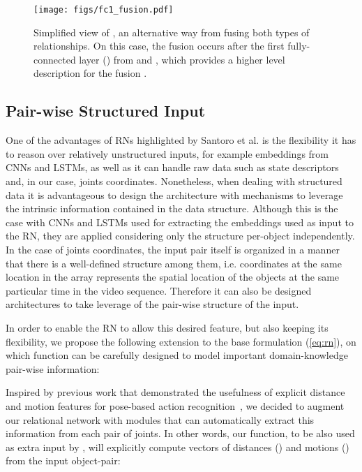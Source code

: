 \documentclass[journal,twoside]{IEEEtran}
\begin{document}
\begin{figure}[t]
	\centering
	\texttt{[image: figs/fc1\_fusion.pdf]}
	\caption{
	Simplified view of , an alternative way from fusing both types of relationships. On this case, the fusion occurs after the first fully-connected layer () from  and , which provides a higher level description for the fusion .
	}
	\label{fig:fc1_fusion}
\end{figure}

\subsection{Pair-wise Structured Input}


One of the advantages of RNs highlighted by Santoro et al.\cite{Santoro2017} is the flexibility it has to reason over relatively unstructured inputs, for example embeddings from CNNs and LSTMs, as well as it can handle raw data such as state descriptors and, in our case, joints coordinates.
Nonetheless, when dealing with structured data it is advantageous to design the architecture with mechanisms to leverage the intrinsic information contained in the data structure.
Although this is the case with CNNs and LSTMs used for extracting the embeddings used as input to the RN, they are applied considering only the structure per-object independently.
In the case of joints coordinates, the input pair itself is organized in a manner that there is a well-defined structure among them, i.e. coordinates at the same location in the array represents the spatial location of the objects at the same particular time in the video sequence.
Therefore it can also be designed architectures to take leverage of the pair-wise structure of the input.

In order to enable the RN to allow this desired feature, but also keeping its flexibility, we propose the following extension to the base formulation (\ref{eq:rn}), on which function  can be carefully designed to model important domain-knowledge pair-wise information:





Inspired by previous work that demonstrated the usefulness of explicit distance and motion features for pose-based action recognition~\cite{Yun2012,Wu2018a}, we decided to augment our relational network with modules that can automatically extract this information from each pair of joints. 
In other words, our  function, to be also used as extra input by , will explicitly compute vectors of distances () and motions () from the input object-pair:
\end{document}
